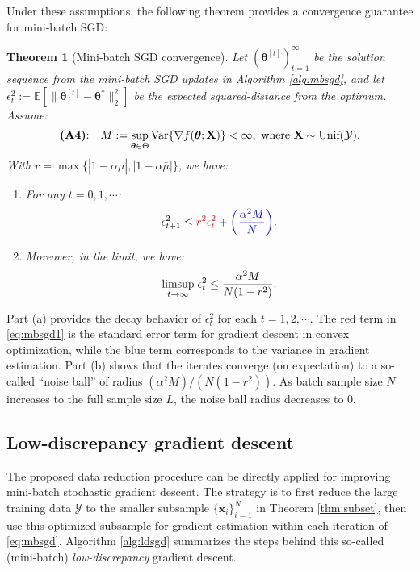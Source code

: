 \documentclass[12pt]{article}
\newtheorem{theorem}{Theorem}
\newcommand{\bm}[1]{\mathbf{#1}}
\newcommand{\crd}[1]{{\color{red}{#1}}}
\newcommand{\cbl}[1]{{\color{blue}{#1}}}
\begin{document}
Under these assumptions, the following theorem provides a convergence guarantee for mini-batch SGD:
\begin{theorem}[Mini-batch SGD convergence]
Let $(\boldsymbol{\theta}^{[t]})_{t=1}^\infty$ be the solution sequence from the mini-batch SGD updates in Algorithm \ref{alg:mbsgd}, and let $\epsilon^2_t := \mathbb{E}[\|\boldsymbol{\theta}^{[t]} - \boldsymbol{\theta}^*\|_2^2]$ be the expected squared-distance from the optimum. Assume:
\begin{equation}
\textup{\textbf{(A4)}:} \quad M := \sup_{\boldsymbol{\theta} \in \Theta} \textup{Var}\{ \nabla f(\boldsymbol{\theta}; \bm{X}) \} < \infty, \text{ where }\bm{X} \sim \textup{Unif}(\mathcal{Y}).
\label{eq:ass1}
\end{equation}
With $r = \max\{ |1-\alpha\underline{\mu}|, |1-\alpha \bar{\mu}| \}$, we have:
\begin{enumerate}[label=(\alph*)]
\item For any $t = 0, 1, \cdots$:
\begin{equation}
\epsilon^2_{t+1} \leq \crd{r^2 \epsilon^2_t} + \cbl{\left( \frac{\alpha^2 M}{N} \right)}.
\label{eq:mbsgd1}
\end{equation}
\item Moreover, in the limit, we have:
\begin{equation}
\underset{t \rightarrow \infty}{\textup{limsup}} \; \epsilon^2_t \leq \frac{\alpha^2 M }{N(1-r^2)}.
\label{eq:mbsgd2}
\end{equation}
\end{enumerate}
\label{thm:mbsgd}
\end{theorem}
Part (a) provides the decay behavior of $\epsilon_t^2$ for each $t = 1, 2, \cdots$. The red term in \eqref{eq:mbsgd1} is the standard error term for gradient descent in convex optimization, while the blue term corresponds to the variance in gradient estimation. Part (b) shows that the iterates converge (on expectation) to a so-called ``noise ball'' of radius $(\alpha^2 M)/(N(1-r^2))$. As batch sample size $N$ increases to the full sample size $L$, the noise ball radius decreases to 0. 

\subsection{Low-discrepancy gradient descent}
The proposed data reduction procedure can be directly applied for improving mini-batch stochastic gradient descent. The strategy is to first reduce the large training data $\mathcal{Y}$ to the smaller subsample $\{\bm{x}_i\}_{i=1}^N$ in Theorem \ref{thm:subset}, then use this optimized subsample for gradient estimation within each iteration of \eqref{eq:mbsgd}. Algorithm \ref{alg:ldsgd} summarizes the steps behind this so-called (mini-batch) \textit{low-discrepancy} gradient descent.\\
\end{document}
